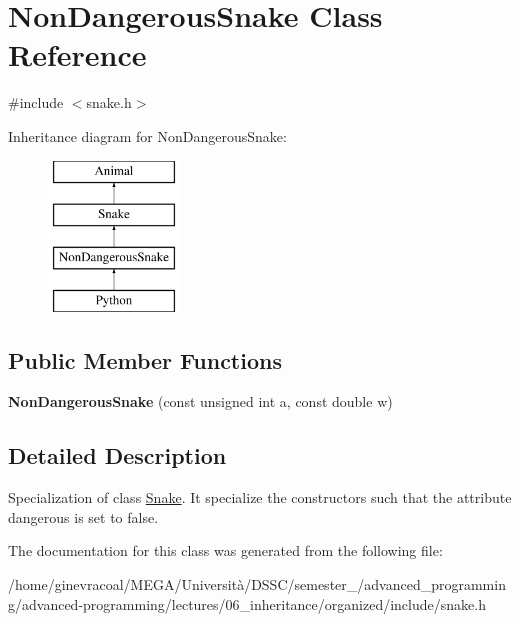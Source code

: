 \hypertarget{classNonDangerousSnake}{}\section{Non\+Dangerous\+Snake Class Reference}
\label{classNonDangerousSnake}


{\ttfamily \#include $<$snake.\+h$>$}

Inheritance diagram for Non\+Dangerous\+Snake\+:\begin{figure}[H]
\begin{center}
\leavevmode
\includegraphics[height=4.000000cm]{classNonDangerousSnake}
\end{center}
\end{figure}
\subsection*{Public Member Functions}
\begin{DoxyCompactItemize}
\item 
{\bfseries Non\+Dangerous\+Snake} (const unsigned int a, const double w)\hypertarget{classNonDangerousSnake_a3f5ac2522dd02fc5d55a34f30eec7e43}{}\label{classNonDangerousSnake_a3f5ac2522dd02fc5d55a34f30eec7e43}

\end{DoxyCompactItemize}


\subsection{Detailed Description}
Specialization of class \hyperlink{classSnake}{Snake}. It specialize the constructors such that the attribute {\ttfamily dangerous} is set to false. 

The documentation for this class was generated from the following file\+:\begin{DoxyCompactItemize}
\item 
/home/ginevracoal/\+M\+E\+G\+A/\+Università/\+D\+S\+S\+C/semester\+\_/advanced\+\_\+programming/advanced-\/programming/lectures/06\+\_\+inheritance/organized/include/snake.\+h\end{DoxyCompactItemize}
